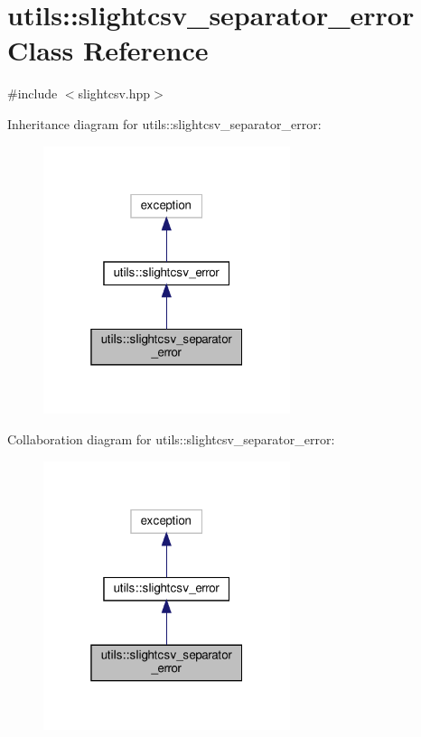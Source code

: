 \hypertarget{classutils_1_1slightcsv__separator__error}{}\section{utils\+:\+:slightcsv\+\_\+separator\+\_\+error Class Reference}
\label{classutils_1_1slightcsv__separator__error}


{\ttfamily \#include $<$slightcsv.\+hpp$>$}



Inheritance diagram for utils\+:\+:slightcsv\+\_\+separator\+\_\+error\+:
\nopagebreak
\begin{figure}[H]
\begin{center}
\leavevmode
\includegraphics[width=205pt]{classutils_1_1slightcsv__separator__error__inherit__graph}
\end{center}
\end{figure}


Collaboration diagram for utils\+:\+:slightcsv\+\_\+separator\+\_\+error\+:
\nopagebreak
\begin{figure}[H]
\begin{center}
\leavevmode
\includegraphics[width=205pt]{classutils_1_1slightcsv__separator__error__coll__graph}
\end{center}
\end{figure}


